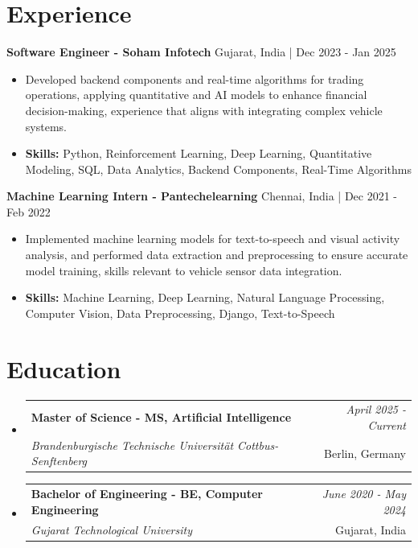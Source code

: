 \documentclass[a4paper,11pt]{article}
\makeatletter
\newcommand{\resumeSubheading}[4]{
\vspace{0.5mm}\item
    \begin{tabular*}{0.98\textwidth}[t]{l@{\extracolsep{\fill}}r}
        \textbf{#1} & \textit{\footnotesize{#4}} \\
        \textit{\footnotesize{#3}} &  \footnotesize{#2}\\
    \end{tabular*}
    \vspace{-2.4mm}
}
\makeatother
\begin{document}
\section{\textbf{Experience}}


\vspace{1mm}
  \textbf{Software Engineer - Soham Infotech} \hfill Gujarat, India | Dec 2023 - Jan 2025
\vspace{-1.5mm} %
\begin{itemize}
  \item Developed backend components and real-time algorithms for trading operations, applying quantitative and AI models to enhance financial decision-making, experience that aligns with integrating complex vehicle systems.

\vspace{-2mm}
  \item \textbf{Skills:} Python, Reinforcement Learning, Deep Learning, Quantitative Modeling, SQL, Data Analytics, Backend Components, Real-Time Algorithms
\end{itemize}

\vspace{1mm}
  \textbf{Machine Learning Intern - Pantechelearning} \hfill Chennai, India | Dec 2021 - Feb 2022
\vspace{-1.5mm} %
\begin{itemize}
  \item Implemented machine learning models for text-to-speech and visual activity analysis, and performed data extraction and preprocessing to ensure accurate model training, skills relevant to vehicle sensor data integration.
\vspace{-2mm}
  \item \textbf{Skills:} Machine Learning, Deep Learning, Natural Language Processing, Computer Vision, Data Preprocessing, Django, Text-to-Speech
\end{itemize}\section{\textbf{Education}}
\vspace{-0.4mm}

\begin{itemize}
\resumeSubheading
{Master of Science - MS, Artificial Intelligence }{Berlin, Germany}
{Brandenburgische Technische Universität Cottbus-Senftenberg  }{April 2025 - Current}

\vspace{1.0mm} %
\resumeSubheading
{Bachelor of Engineering - BE, Computer Engineering  }{Gujarat, India}
{Gujarat Technological University }{June 2020 - May 2024}

\end{itemize}
\end{document}
